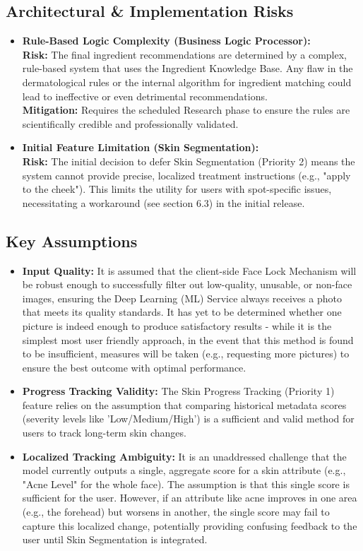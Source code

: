 \documentclass[12pt,a4paper]{article}
\begin{document}
\subsection{Architectural \& Implementation Risks}
\begin{itemize}
    \item \textbf{Rule-Based Logic Complexity (Business Logic Processor):}\\ \textbf{Risk:} The final ingredient recommendations are determined by a complex, rule-based system that uses the Ingredient Knowledge Base. Any flaw in the dermatological rules or the internal algorithm for ingredient matching could lead to ineffective or even detrimental recommendations.\\ \textbf{Mitigation:} Requires the scheduled Research phase to ensure the rules are scientifically credible and professionally validated.
    \item \textbf{Initial Feature Limitation (Skin Segmentation):}\\ \textbf{Risk:} The initial decision to defer Skin Segmentation (Priority 2) means the system cannot provide precise, localized treatment instructions (e.g., "apply to the cheek"). This limits the utility for users with spot-specific issues, necessitating a workaround (see section 6.3) in the initial release.
\end{itemize}

\subsection{Key Assumptions}
\begin{itemize}
    \item \textbf{Input Quality:} It is assumed that the client-side Face Lock Mechanism will be robust enough to successfully filter out low-quality, unusable, or non-face images, ensuring the Deep Learning (ML) Service always receives a photo that meets its quality standards. It has yet to be determined whether one picture is indeed enough to produce satisfactory results - while it is the simplest most user friendly approach, in the event that this method is found to be insufficient, measures will be taken (e.g., requesting more pictures) to ensure the best outcome with optimal performance.
    \item \textbf{Progress Tracking Validity:} The Skin Progress Tracking (Priority 1) feature relies on the assumption that comparing historical metadata scores (severity levels like 'Low/Medium/High') is a sufficient and valid method for users to track long-term skin changes.
    \item \textbf{Localized Tracking Ambiguity:} It is an unaddressed challenge that the model currently outputs a single, aggregate score for a skin attribute (e.g., "Acne Level" for the whole face). The assumption is that this single score is sufficient for the user. However, if an attribute like acne improves in one area (e.g., the forehead) but worsens in another, the single score may fail to capture this localized change, potentially providing confusing feedback to the user until Skin Segmentation is integrated.
\end{itemize}
\end{document}
